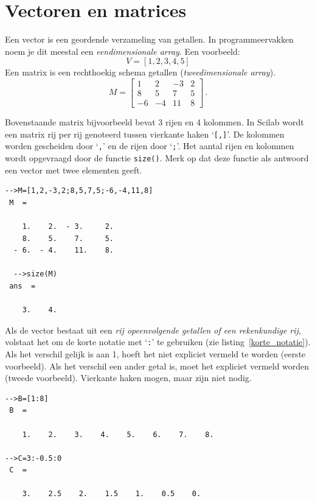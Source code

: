 \section{Vectoren en matrices}
\label{sec:scilabMatrices}
Een vector is een geordende verzameling van getallen. In programmeervakken noem je dit meestal een \emph{eendimensionale array}. Een voorbeeld:
\begin{displaymath}
V=[1,2,3,4,5]
\end{displaymath}
Een matrix is een rechthoekig schema getallen (\emph{tweedimensionale array}). 
\begin{displaymath}
M=\begin{bmatrix}
 1&2  &-3 &2 \\
 8& 5 &7 &5 \\
 -6& -4 &11&8
\end{bmatrix}\,.
\end{displaymath}

Bovenstaande matrix bijvoorbeeld bevat 3 rijen en 4 kolommen. In Scilab wordt een matrix  rij per rij genoteerd tussen vierkante haken `\verb+[,]+'. De kolommen worden gescheiden door `\verb+,+' en de rijen door `\verb+;+'. Het aantal rijen en kolommen wordt opgevraagd door de functie \verb+size()+. Merk op dat deze functie als antwoord een vector met twee elementen geeft.

\begin{lstlisting}[caption={Een matrix defini\"eren}, label=Matrixdef]
-->M=[1,2,-3,2;8,5,7,5;-6,-4,11,8]
 M  =
 
    1.    2.  - 3.     2.  
    8.    5.    7.     5.  
  - 6.  - 4.    11.    8.  
  
  -->size(M)
 ans  =
 
    3.    4.  
\end{lstlisting}

Als de vector bestaat uit een \emph{rij opeenvolgende getallen of een rekenkundige rij}, volstaat het om de korte notatie met `\verb+:+' te gebruiken (zie listing~\ref{korte_notatie}). Als het verschil gelijk is aan 1, hoeft het niet expliciet vermeld te worden (eerste voorbeeld). Als het verschil een ander getal is, moet het expliciet vermeld worden (tweede voorbeeld). Vierkante haken mogen, maar zijn niet nodig.
\begin{lstlisting}[caption={Een matrix defini\"eren: korte notatie}, label=korte_notatie]
-->B=[1:8]
 B  =
 
    1.    2.    3.    4.    5.    6.    7.    8.  
 
-->C=3:-0.5:0
 C  =
 
    3.    2.5    2.    1.5    1.    0.5    0.  
 
\end{lstlisting}



